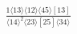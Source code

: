 \documentclass[varwidth, border=5pt]{standalone}
\begin{document}
\begin{my}
$\begin{gathered}
\scriptscriptstyle\frac{1⟨13⟩⟨12⟩⟨45⟩[13]}{⟨14⟩^2⟨23⟩[25]⟨34⟩}
\end{gathered}$
\end{my}
\end{document}
